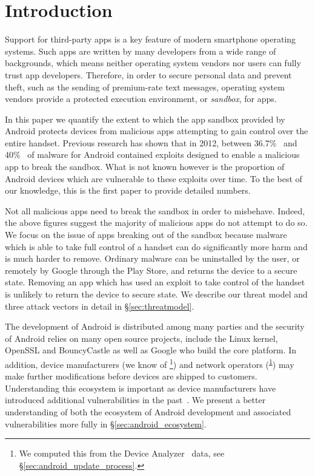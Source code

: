 \documentclass[conference,a4paper,twoside]{IEEEtran}
\newcommand{\da}{Device Analyzer}
\newcommand{\dafoot}{\textsuperscript{\ref{foot:dadata}}}
\newcommand{\percMarketShare}{83.6\%~\footnote{\url{http://www.theinquirer.net/inquirer/news/2379036/android-hits-836-percent-marketshare-while-ios-windows-and-blackberry-slide}}}
\begin{document}
\section{Introduction}

Support for third-party apps is a key feature of modern smartphone operating systems.
Such apps are written by many developers from a wide range of backgrounds, which means neither operating system vendors nor users can fully trust app developers.
Therefore, in order to secure personal data and prevent theft, such as the sending of premium-rate text messages, operating system vendors provide a protected execution environment, or \emph{sandbox}, for apps.

In this paper we quantify the extent to which the app sandbox provided by Android protects devices from malicious apps attempting to gain control over the entire handset.
Previous research has shown that in 2012, between 36.7\%~\cite{Zhou2012b} and 40\%~\cite{Zhou2012a} of malware for Android contained exploits designed to enable a malicious app to break the sandbox.
What is not known however is the proportion of Android devices which are vulnerable to these exploits over time.
To the best of our knowledge, this is the first paper to provide detailed numbers.

Not all malicious apps need to break the sandbox in order to misbehave.
Indeed, the above figures suggest the majority of malicious apps do not attempt to do so.
We focus on the issue of apps breaking out of the sandbox because malware which is able to take full control of a handset can do significantly more harm and is much harder to remove.
Ordinary malware can be uninstalled by the user, or remotely by Google through the Play Store, and returns the device to a secure state. 
Removing an app which has used an exploit to take control of the handset is unlikely to return the device to secure state.
We describe our threat model and three attack vectors in detail in \S\ref{sec:threatmodel}.

The development of Android is distributed among many parties and the security of Android relies on many open source projects, include the Linux kernel, OpenSSL and BouncyCastle as well as Google who build the core platform. 
In addition, device manufacturers (we know of \daNumManufacturers\footnote{\label{foot:dadata}We computed this from the \da~\cite{Wagner2013} data, see \S\ref{sec:android_update_process}.}) and network operators (\daNumOperators\dafoot) may make further modifications before devices are shipped to customers. 
Understanding this ecosystem is important as device manufacturers have introduced additional vulnerabilities in the past~\cite{Grace2012}. 
We present a better understanding of both the ecosystem of Android development and associated vulnerabilities more fully in \S\ref{sec:android_ecosystem}.
 
\end{document}
